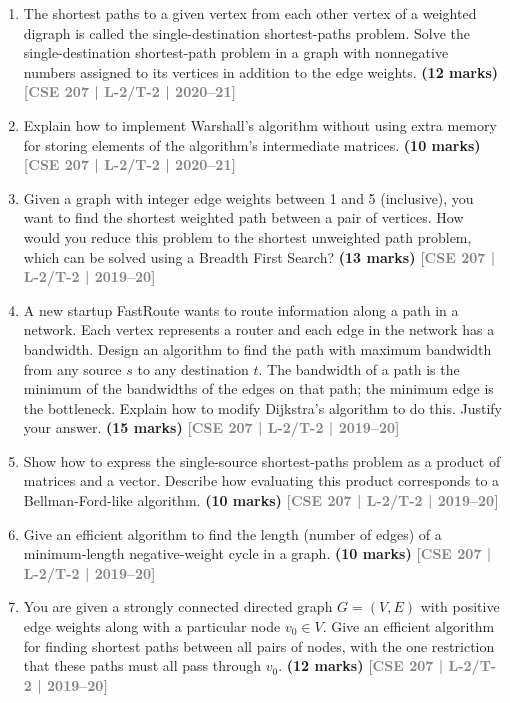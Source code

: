 \documentclass[12pt]{article}
\newcommand{\yr}[1]{\hfill\textcolor{gray}{\small\textbf{[#1]}}}
\newcommand{\mk}[1]{\textcolor{orange!70!black}{\small\textbf{(#1 marks)}}}
\begin{document}
\begin{enumerate}
\begin{center}
\begin{tikzpicture}
    \end{tikzpicture}
\end{center}

\mk{12} \yr{CSE 207 | L-2/T-2 | 2020--21}


\item The shortest paths to a given vertex from each other vertex of a weighted digraph is called the single-destination shortest-paths problem. Solve the single-destination shortest-path problem in a graph with nonnegative numbers assigned to its vertices in addition to the edge weights.
\mk{12} \yr{CSE 207 | L-2/T-2 | 2020--21}


\item Explain how to implement Warshall's algorithm without using extra memory for storing elements of the algorithm's intermediate matrices.
\mk{10} \yr{CSE 207 | L-2/T-2 | 2020--21}


\item Given a graph with integer edge weights between 1 and 5 (inclusive), you want to find the shortest weighted path between a pair of vertices. How would you reduce this problem to the shortest unweighted path problem, which can be solved using a Breadth First Search?
\mk{13} \yr{CSE 207 | L-2/T-2 | 2019--20}


\item A new startup FastRoute wants to route information along a path in a network. Each vertex represents a router and each edge in the network has a bandwidth. Design an algorithm to find the path with maximum bandwidth from any source $s$ to any destination $t$. The bandwidth of a path is the minimum of the bandwidths of the edges on that path; the minimum edge is the bottleneck. Explain how to modify Dijkstra's algorithm to do this. Justify your answer.
\mk{15} \yr{CSE 207 | L-2/T-2 | 2019--20}


\item Show how to express the single-source shortest-paths problem as a product of matrices and a vector. Describe how evaluating this product corresponds to a Bellman-Ford-like algorithm.
\mk{10} \yr{CSE 207 | L-2/T-2 | 2019--20}



\item Give an efficient algorithm to find the length (number of edges) of a minimum-length negative-weight cycle in a graph.
\mk{10} \yr{CSE 207 | L-2/T-2 | 2019--20}


\item You are given a strongly connected directed graph $G = (V, E)$ with positive edge weights along with a particular node $v_0 \in V$. Give an efficient algorithm for finding shortest paths between all pairs of nodes, with the one restriction that these paths must all pass through $v_0$.
\mk{12} \yr{CSE 207 | L-2/T-2 | 2019--20}



\end{enumerate}
\end{document}
